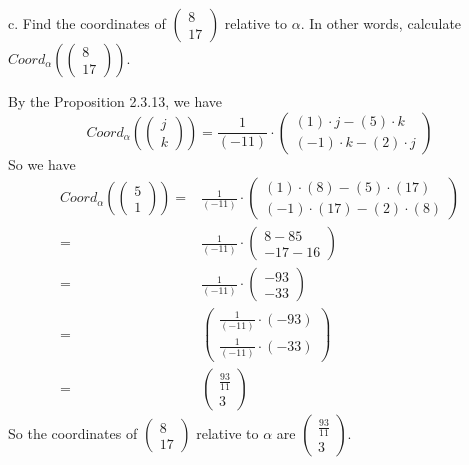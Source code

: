 \documentclass[12pt]{article}
\newenvironment{problem}[2][Problem]
{
	\begin{trivlist} 
		\item[\hskip \labelsep {\bfseries #1 #2:}]
	}
{
	\end{trivlist}
	}
\newenvironment{solution}[1][Solution]
{
	\begin{trivlist} 
		\item[\hskip \labelsep {\itshape #1:}]
	}
	{
	\end{trivlist}
}
\begin{document}
\begin{problem}{4}
\begin{solution}
\end{solution}
\newpage
c. Find the coordinates of $\begin{pmatrix}8 \\ 17 \end{pmatrix}$ relative to $\alpha$. In other words, calculate $Coord_{\alpha}\left(  \begin{pmatrix}8 \\ 17 \end{pmatrix} \right)$.
\begin{solution}
By the Proposition 2.3.13, we have 
\[
Coord_{\alpha}\left(\begin{pmatrix}j\\k\end{pmatrix}\right) = \frac{1}{(-11)} \cdot \begin{pmatrix}(1)\cdot j-(5)\cdot k\\(-1) \cdot k-(2) \cdot j\end{pmatrix}
\]
So we have
\begin{align*}
Coord_{\alpha}\left(  \begin{pmatrix}5 \\ 1 \end{pmatrix} \right) =& \frac{1}{(-11)} \cdot \begin{pmatrix}(1)\cdot (8)-(5)\cdot (17)\\(-1) \cdot (17)-(2) \cdot (8)\end{pmatrix}\\
=& \frac{1}{(-11)} \cdot \begin{pmatrix}8-85\\-17-16\end{pmatrix}\\
=& \frac{1}{(-11)} \cdot \begin{pmatrix}-93\\-33\end{pmatrix}\\
=& \begin{pmatrix} \frac{1}{(-11)} \cdot (-93)\\ \frac{1}{(-11)} \cdot (-33)\end{pmatrix}\\
=& \begin{pmatrix}\frac{93}{11}\\3\end{pmatrix}
\end{align*}
So the coordinates of $\begin{pmatrix}8 \\ 17 \end{pmatrix}$ relative to $\alpha$ are $\begin{pmatrix}\frac{93}{11}\\3\end{pmatrix}$.

\end{solution}
\end{problem}
\end{document}
